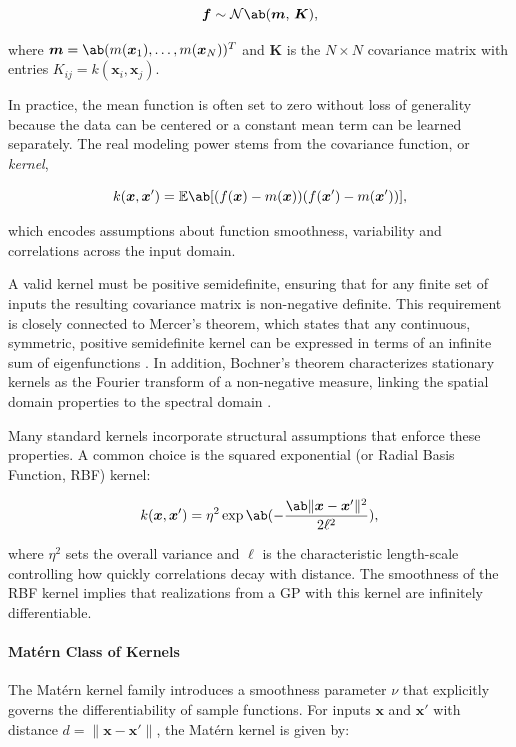 \begin{equation}
    \bm{f} \sim \mathcal{N}\ab(\bm{m},\, \bm{K}),
\end{equation}

where $\bm{m} = \ab( m(\bm{x}_1),\dots,m(\bm{x}_N) )^T$ and $\bm{K}$ is the $N\times N$ covariance matrix with entries $K_{ij} = k(\bm{x}_i, \bm{x}_j)$.

In practice, the mean function is often set to zero without loss of generality because the data can be centered or a constant mean term can be learned separately. The real modeling power stems from the covariance function, or \emph{kernel},

\begin{equation}
    k(\bm{x},\bm{x}')=\mathbb{E}\ab[(f(\bm{x})-m(\bm{x}))(f(\bm{x}')-m(\bm{x}'))],    
\end{equation}

which encodes assumptions about function smoothness, variability and correlations across the input domain.

A valid kernel must be positive semidefinite, ensuring that for any finite set of inputs the resulting covariance matrix is non-negative definite. This requirement is closely connected to Mercer's theorem, which states that any continuous, symmetric, positive semidefinite kernel can be expressed in terms of an infinite sum of eigenfunctions \cite[][p.96]{rasmussen_gaussian_2006}. In addition, Bochner's theorem characterizes stationary kernels as the Fourier transform of a non-negative measure, linking the spatial domain properties to the spectral domain \cite[][p.82]{rasmussen_gaussian_2006}.

Many standard kernels incorporate structural assumptions that enforce these properties. A common choice is the squared exponential (or Radial Basis Function, RBF) kernel:

\begin{align}
    k(\bm{x},\bm{x}') = \eta^2 \exp \ab(-\frac{\ab \| \bm{x}-\bm{x}' \|^2}{2\ell^2}),
\end{align}

where $\eta^2$ sets the overall variance and $\ell$ is the characteristic length-scale controlling how quickly correlations decay with distance. The smoothness of the RBF kernel implies that realizations from a GP with this kernel are infinitely differentiable.

\paragraph{Matérn Class of Kernels}
The Matérn kernel family introduces a smoothness parameter $\nu$ that explicitly governs the differentiability of sample functions. For inputs $\bm{x}$ and $\bm{x}'$ with distance $d = \|\bm{x} - \bm{x}'\|$, the Matérn kernel is given by:

